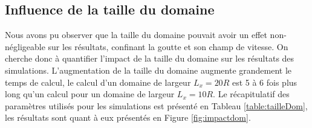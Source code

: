 \subsection{Influence de la taille du domaine} \label{sec:tailledom}
Nous avons pu observer que la taille du domaine pouvait avoir un effet non-négligeable sur les résultats, confinant la goutte et son champ de vitesse. On cherche donc à quantifier l'impact de la taille du domaine sur les résultats des simulations. L'augmentation de la taille du domaine augmente grandement le temps de calcul, le calcul d'un domaine de largeur $L_x = 20R$ est 5 à 6 fois plus long qu'un calcul pour un domaine de largeur $L_x=10R$. Le récapitulatif des paramètres utilisés pour les simulations est présenté en Tableau \ref{table:tailleDom}, les résultats sont quant à eux présentés en Figure \ref{fig:impactdom}.



